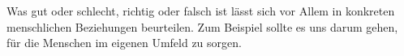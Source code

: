 Was gut oder schlecht, richtig oder falsch ist lässt sich vor Allem in konkreten menschlichen Beziehungen beurteilen.
Zum Beispiel sollte es uns darum gehen, für die Menschen im eigenen Umfeld zu sorgen.